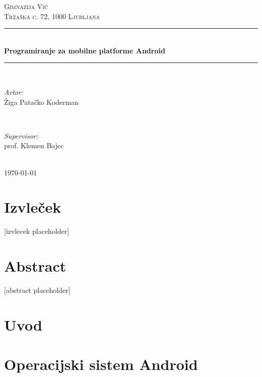 \documentclass[a4paper, 12pt]{article}
\begin{document}
\begin{titlepage}
	\newcommand{\HRule}{\rule{\linewidth}{0.5mm}}
	\center

	\textsc{\LARGE Gimnazija Vič}\\[0.5cm]
	\textsc{\Large Tržaška c. 72, 1000 Ljubljana}\\[1.5cm]

	\HRule \\[0.4cm]
	{ \huge \bfseries Programiranje za mobilne platforme Android}\\[0.4cm]
	\HRule \\[1.5cm]

	\begin{minipage}{0.4\textwidth}
		\begin{flushleft} \large
			\emph{Avtor:}\\
			Žiga Patačko Koderman
		\end{flushleft}
	\end{minipage}
	~
	\begin{minipage}{0.4\textwidth}
		\begin{flushright} \large
			\emph{Supervisor:} \\
			prof. Klemen Bajec
		\end{flushright}
		\end{minipage}\\[4cm]

		{\large \today}\\[3cm]

		\vfill
	\end{titlepage}

	\section*{Izvleček}
	[izvlecek placeholder]

	\section*{Abstract}
	[abstract placeholder]

	\pagebreak

	\tableofcontents
	\pagebreak

	\section{Uvod}
	
	
	\section{Operacijski sistem Android}
\end{document}

